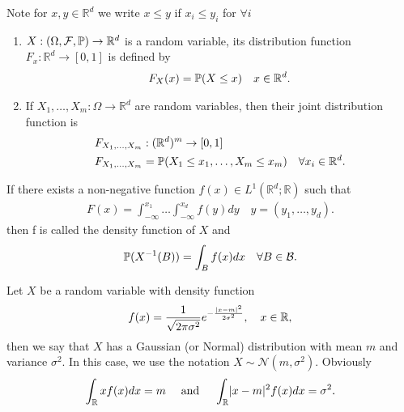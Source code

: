 \begin{definition}
 Note for $x,y \in  \mathbb{R}^{d} $  we write $x\le y$ if $x_i \le  y_i$ for $\forall i$
 \begin{enumerate}
   \item $X: (\Omega ,\mathcal{F},\P) \to \mathbb{R}^{d} $ is a random variable, its distribution function $F_x : \mathbb{R}^{d} \to [0,1] $
     is defined by 
     \begin{align*}
      F_X(x) = \P(X\le x) \quad x \in  \mathbb{R}^{d} 
     .\end{align*}
    \item If $X_{1},\ldots ,X_m : \Omega \to \mathbb{R}^{d} $ are random variables, then their joint distribution function is
      \begin{align*}
        F_{X_{1},\ldots ,X_m} &: (\mathbb{R}^{d} )^m \to [0,1]\\
        F_{X_{1},\ldots ,X_m} &= \P(X_{1}\le x_{1},\ldots ,X_m\le x_m) \quad \forall x_i \in \mathbb{R}^{d} 
      .\end{align*}
 \end{enumerate}
\end{definition}
\begin{definition}
 If there exists a non-negative function $f(x) \in  L^{1}(\mathbb{R}^{d} ; \mathbb{R} ) $   such that 
 \begin{align*}
   F(x) = \int_{-\infty}^{x_{1}}  \ldots \int_{-\infty}^{x_d} f(y) dy \quad y = (y_{1},\ldots ,y_d)
 .\end{align*}
 then f is called the density function of $X$ and 
 \begin{align*}
  \P(X^{-1}(B) ) = \int_B f(x) dx \quad \forall  B \in  \mathcal{B}
 .\end{align*}
\end{definition}
\begin{example}
 Let $X$ be a random variable with density function 
 \begin{align*}
 f(x) = \frac{1}{\sqrt{2\pi \sigma ^2}}e^{-\frac{\abs{x-m}^2}{2\sigma ^2}}, \quad x \in  \mathbb{R},
 \end{align*}
 then we say that $X$ has a Gaussian (or Normal) distribution with mean $m$ and variance $\sigma^2$. In this case, we use the notation $  X \sim \mathcal{N}(m,\sigma^2)$.
 Obviously 
 \begin{align*}
   \int_{\mathbb{R}} xf(x) dx = m \quad \text{ and } \quad \int_{\mathbb{R}}\abs{x-m}^2f(x) dx = \sigma^2
  .\end{align*}
\end{example}
